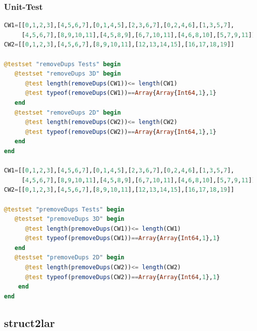 \documentclass[a4paper,12pt]{article}
\begin{document}
\subsubsection{Unit-Test}
\begin{lstlisting}[language=Julia]
CW1=[[0,1,2,3],[4,5,6,7],[0,1,4,5],[2,3,6,7],[0,2,4,6],[1,3,5,7],
     [4,5,6,7],[8,9,10,11],[4,5,8,9],[6,7,10,11],[4,6,8,10],[5,7,9,11]]
CW2=[[0,1,2,3],[4,5,6,7],[8,9,10,11],[12,13,14,15],[16,17,18,19]]

@testset "removeDups Tests" begin
   @testset "removeDups 3D" begin
      @test length(removeDups(CW1))<= length(CW1)
      @test typeof(removeDups(CW1))==Array{Array{Int64,1},1}
   end
   @testset "removeDups 2D" begin
      @test length(removeDups(CW2))<= length(CW2)
      @test typeof(removeDups(CW2))==Array{Array{Int64,1},1}
   end
end

CW1=[[0,1,2,3],[4,5,6,7],[0,1,4,5],[2,3,6,7],[0,2,4,6],[1,3,5,7],
     [4,5,6,7],[8,9,10,11],[4,5,8,9],[6,7,10,11],[4,6,8,10],[5,7,9,11]]
CW2=[[0,1,2,3],[4,5,6,7],[8,9,10,11],[12,13,14,15],[16,17,18,19]]

@testset "premoveDups Tests" begin
   @testset "premoveDups 3D" begin
      @test length(premoveDups(CW1))<= length(CW1)
      @test typeof(premoveDups(CW1))==Array{Array{Int64,1},1}
   end
   @testset "premoveDups 2D" begin
      @test length(premoveDups(CW2))<= length(CW2)
      @test typeof(premoveDups(CW2))==Array{Array{Int64,1},1}
    end
end
\end{lstlisting}
\newpage
\subsection{struct2lar}
\end{document}
